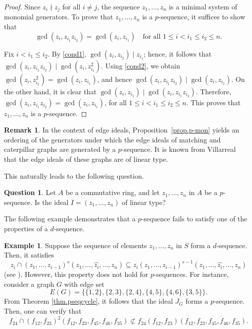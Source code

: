 \documentclass[11pt,a4paper,reqno]{amsart}
\theoremstyle{definition}
\newtheorem{remark}[theorem]{Remark}
\newtheorem{example}[theorem]{Example}
\newtheorem{question}[theorem]{Question}
\begin{document}
\begin{proof}
Since $z_i\nmid z_j$ for all $i\neq j$, the sequence $z_1,\ldots,z_n$ is a minimal system of monomial generators. To prove that \(z_1,\ldots,z_n\) is a \(p\)-sequence, it suffices to show that
\[
\gcd(z_i, z_{i_1}z_{i_2}) = \gcd(z_i, z_{i_1})
\quad \text{for all } 1 \leq i < i_1 \leq i_2 \leq n.
\]

Fix \(i < i_1 \leq i_2\). By \eqref{cond1}, \(\gcd(z_i, z_{i_2}) \mid z_{i_1}\); hence, it follows that \(\gcd(z_i, z_{i_1}z_{i_2}) \mid \gcd(z_i, z_{i_1}^2)\). Using \eqref{cond2}, we obtain $\gcd(z_i, z_{i_1}^2) = \gcd(z_i, z_{i_1})$,
and hence
$\gcd(z_i, z_{i_1}z_{i_2}) \mid \gcd(z_i, z_{i_1})$.
On the other hand, it is clear that
$\gcd(z_i, z_{i_1}) \mid \gcd(z_i, z_{i_1}z_{i_2})$.
Therefore,
$\gcd(z_i, z_{i_1}z_{i_2}) = \gcd(z_i, z_{i_1})$,
for all \(1 \leq i < i_1 \leq i_2 \leq n\). This proves that \(z_1,\ldots,z_n\) is a \(p\)-sequence.
\end{proof}


\begin{remark}
    In the context of edge ideals, Proposition~\ref{prop.p-mon} yields an ordering of the generators under which the edge ideals of matching and caterpillar graphs are generated by a \(p\)-sequence.  It is known from Villarreal~\cite{V1990} that the edge ideals of these graphs are of linear type.
\end{remark}

This naturally leads to the following question.


\begin{question}\label{qus.linear}
Let \(A\) be a commutative ring, and let \(z_1,\ldots,z_n\) in  \(A\) be a \(p\)-sequence. Is the ideal \(I=(z_1,\ldots,z_n)\) of linear type?
\end{question}


The following example demonstrates that a $p$-sequence fails to satisfy one of the properties of a $d$-sequence.
\begin{example}
    Suppose the sequence of elements $z_1,\ldots,z_n$ in $S$ form a $d$-sequence. Then, it satisfies  $$z_i \cap ( z_1,\ldots,z_{i-1})^s(z_1,\ldots,\hat{z_i},\ldots,z_n)\subseteq z_i(z_1,\ldots,z_{i-1})^{s-1}(z_1,\ldots,\hat{z_i},\ldots,z_n)$$ (see \cite[Proposition 3.1]{H1980}). However, this property does not hold for $p$-sequences. For instance, consider a graph $G$ with edge set $$E(G)=\{\{1,2\},\{2,3\},\{2,4\},\{4,5\},\{4,6\},\{3,5\}\}.$$ From Theorem \ref{thm.pseqcycle}, it follows that the ideal $J_G$ forms a $p$-sequence. Then, one can verify that $$f_{24}\cap (f_{12},f_{23})^2(f_{12},f_{23},f_{45},f_{46},f_{35}) \not\subset f_{24}(f_{12},f_{23})(f_{12},f_{23},f_{45},f_{46},f_{35}).$$
\end{example}
\end{document}

